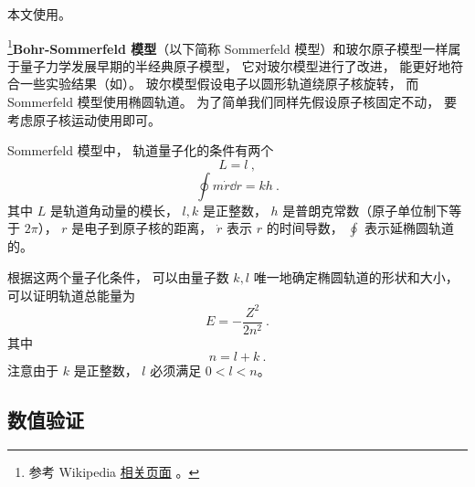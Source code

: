 

本文使用。

\footnote{参考 Wikipedia \href{https://en.wikipedia.org/wiki/Old_quantum_theory}{相关页面}
。}\textbf{Bohr-Sommerfeld 模型}（以下简称 Sommerfeld 模型）和玻尔原子模型一样属于量子力学发展早期的半经典原子模型， 它对玻尔模型进行了改进， 能更好地符合一些实验结果（如）。 玻尔模型假设电子以圆形轨道绕原子核旋转， 而 Sommerfeld 模型使用椭圆轨道。 为了简单我们同样先假设原子核固定不动， 要考虑原子核运动使用即可。

Sommerfeld 模型中， 轨道量子化的条件有两个
\begin{equation}\label{eq_BohrEc_4}
L = l~,
\end{equation}
\begin{equation}\label{eq_BohrEc_3}
\oint m\dot r \dd{r} = kh~.
\end{equation}
其中 $L$ 是轨道角动量的模长， $l, k$ 是正整数， $h$ 是普朗克常数（原子单位制下等于 $2\pi$）， $r$ 是电子到原子核的距离， $\dot r$ 表示 $r$ 的时间导数， $\oint$ 表示延椭圆轨道的。

根据这两个量子化条件， 可以由量子数 $k, l$ 唯一地确定椭圆轨道的形状和大小， 可以证明轨道总能量为
\begin{equation}\label{eq_BohrEc_5}
E = -\frac{Z^2}{2n^2}~.
\end{equation}
其中
\begin{equation}\label{eq_BohrEc_2}
n = l + k~.
\end{equation}
注意由于 $k$ 是正整数， $l$ 必须满足 $0 < l < n$。

\subsection{数值验证}


